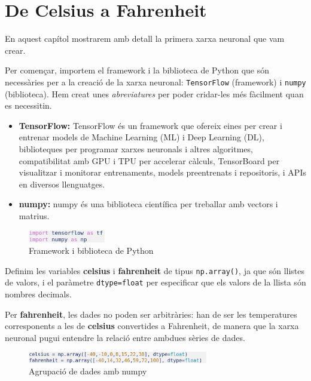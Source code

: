 \chapter{De Celsius a Fahrenheit}\label{a:CelsiusFahrenheit}
En aquest capítol mostrarem amb detall la primera xarxa neuronal que vam crear.

Per començar, importem el framework i la biblioteca de Python que són necessàries per a la creació de la xarxa neuronal: \texttt{TensorFlow} (framework) i \texttt{numpy} (biblioteca). Hem creat unes \textit{abreviatures} per poder cridar-les més fàcilment quan es necessitin.

\begin{itemize}
\item \textbf{TensorFlow:} TensorFlow és un framework que ofereix eines per crear i entrenar models de Machine Learning (ML) i Deep Learning (DL), biblioteques per programar xarxes neuronals i altres algoritmes, compatibilitat amb GPU i TPU per accelerar càlculs, TensorBoard per visualitzar i monitorar entrenaments, models preentrenats i repositoris, i APIs en diversos llenguatges.
\item \textbf{numpy:} numpy és una biblioteca científica per treballar amb vectors i matrius.
\end{itemize}

\begin{figure}[H]
\centering
\includegraphics[width=0.3\textwidth]{./figures/1.png}
\caption{Framework i biblioteca de Python}
\end{figure}

Definim les variables \textbf{celsius} i \textbf{fahrenheit} de tipus \texttt{np.array()}, ja que són llistes de valors, i el paràmetre \texttt{dtype=float} per especificar que els valors de la llista són nombres decimals.

Per \textbf{fahrenheit}, les dades no poden ser arbitràries: han de ser les temperatures corresponents a les de \textbf{celsius} convertides a Fahrenheit, de manera que la xarxa neuronal pugui entendre la relació entre ambdues sèries de dades.

\begin{figure}[H]
\centering
\includegraphics[width=0.7\textwidth]{./figures/2.png}
\caption{Agrupació de dades amb numpy}
\end{figure}

